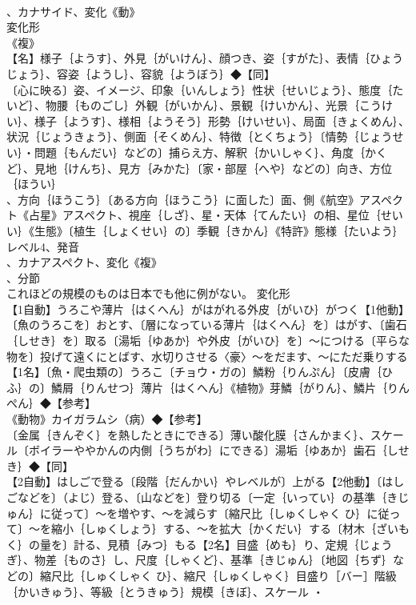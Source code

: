 \documentclass[8pt]{extreport}
\begin{document}
\begin{CJK}{UTF8}{min}
\\	、カナサイド、変化《動》
\\	変化形 
\\	《複》
\\	【名】様子｛ようす｝、外見｛がいけん｝、顔つき、姿｛すがた｝、表情｛ひょうじょう｝、容姿｛ようし｝、容貌｛ようぼう｝◆【同】
\\	〔心に映る〕姿、イメージ、印象｛いんしょう｝性状｛せいじょう｝、態度｛たいど｝、物腰｛ものごし｝外観｛がいかん｝、景観｛けいかん｝、光景｛こうけい｝、様子｛ようす｝、様相｛ようそう｝形勢｛けいせい｝、局面｛きょくめん｝、状況｛じょうきょう｝、側面｛そくめん｝、特徴｛とくちょう｝〔情勢｛じょうせい｝・問題｛もんだい｝などの〕捕らえ方、解釈｛かいしゃく｝、角度｛かくど｝、見地｛けんち｝、見方｛みかた｝〔家・部屋｛へや｝などの〕向き、方位｛ほうい｝
\\	、方向｛ほうこう｝〔ある方向｛ほうこう｝に面した〕面、側《航空》アスペクト《占星》アスペクト、視座｛しざ｝、星・天体｛てんたい｝の相、星位｛せいい｝《生態》〔植生｛しょくせい｝の〕季観｛きかん｝《特許》態様｛たいよう｝レベル4、発音
\\	、カナアスペクト、変化《複》
\\	、分節
\\	これほどの規模のものは日本でも他に例がない。	変化形 
\\	【1自動】うろこや薄片｛はくへん｝がはがれる外皮｛がいひ｝がつく【1他動】〔魚のうろこを〕おとす、〔層になっている薄片｛はくへん｝を〕はがす、〔歯石｛しせき｝を〕取る〔湯垢｛ゆあか｝や外皮｛がいひ｝を〕～につける〔平らな物を〕投げて遠くにとばす、水切りさせる〈豪〉～をだます、～にただ乗りする【1名】〔魚・爬虫類の〕うろこ〔チョウ・ガの〕鱗粉｛りんぷん｝〔皮膚｛ひふ｝の〕鱗屑｛りんせつ｝薄片｛はくへん｝《植物》芽鱗｛がりん｝、鱗片｛りんぺん｝◆【参考】
\\	《動物》カイガラムシ（病）◆【参考】
\\	〔金属｛きんぞく｝を熱したときにできる〕薄い酸化膜｛さんかまく｝、スケール〔ボイラーややかんの内側｛うちがわ｝にできる〕湯垢｛ゆあか｝歯石｛しせき｝◆【同】
\\	【2自動】はしごで登る〔段階｛だんかい｝やレベルが〕上がる【2他動】〔はしごなどを〕（よじ）登る、〔山などを〕登り切る〔一定｛いってい｝の基準｛きじゅん｝に従って〕～を増やす、～を減らす〔縮尺比｛しゅくしゃく ひ｝に従って〕～を縮小｛しゅくしょう｝する、～を拡大｛かくだい｝する〔材木｛ざいもく｝の量を〕計る、見積｛みつ｝もる【2名】目盛｛めも｝り、定規｛じょうぎ｝、物差｛ものさ｝し、尺度｛しゃくど｝、基準｛きじゅん｝〔地図｛ちず｝などの〕縮尺比｛しゅくしゃく ひ｝、縮尺｛しゅくしゃく｝目盛り［バー］階級｛かいきゅう｝、等級｛とうきゅう｝規模｛きぼ｝、スケール ・

\end{CJK}
\end{document}
